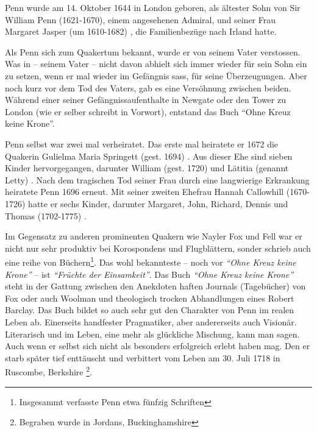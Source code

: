 \medskip

Penn wurde am 14. Oktober 1644 in London
 geboren, als ältester Sohn von Sir William Penn
(1621-1670), einem angesehenen Admiral, und
seiner Frau Margaret Jasper (um 1610-1682) ,
die Familienbezüge nach Irland  hatte.

\medskip

Als Penn sich zum Quakertum bekannt, wurde er von seinem Vater verstossen. Was
in -- seinem Vater -- nicht davon abhielt sich immer wieder für sein Sohn ein zu
setzen, wenn er mal wieder im Gefängnis sass, für seine Überzeugungen. Aber noch
kurz vor dem Tod des Vaters, gab es eine Versöhnung zwischen beiden. Während
einer seiner Gefängnissaufenthalte in Newgate  oder den Tower zu London (wie er selber schreibt in Vorwort), entstand
das Buch "`Ohne Kreuz keine Krone"'.

\medskip

Penn selbst war zwei mal verheiratet. Das erste mal heiratete er 1672 die
Quakerin Gulielma Maria Springett (gest. 1694)
. Aus dieser Ehe sind sieben Kinder
hervorgegangen, darunter William (gest. 1720) und Lätitia (genannt Letty)
. Nach dem tragischen Tod seiner Frau
durch eine langwierige Erkrankung heiratete Penn 1696 erneut. Mit seiner zweiten
Ehefrau Hannah Callowhill (1670-1726)  hatte
er sechs Kinder, darunter Margaret, John, Richard, Dennis und Thomas (1702-1775)
.

\medskip

Im Gegensatz zu anderen prominenten Quakern wie Nayler  Fox und Fell war er nicht nur sehr produktiv bei Korospondens und
Flugblättern, sonder schrieb auch eine reihe von
Büchern\footnote{Insgesammt verfasste Penn etwa fünfzig Schriften}.
Das wohl bekannteste -- noch vor \textit{"`Ohne Kreuz keine Krone"'} -- ist
\textit{"`Früchte der Einsamkeit"'}. Das Buch \textit{"`Ohne Kreuz keine
Krone"'} steht in der Gattung zwischen den Anekdoten haften Journals (Tagebücher) von Fox
oder auch Woolman und theologisch trocken
Abhandlungen eines Robert Barclay. Das Buch
bildet so auch sehr gut den Charakter von Penn im realen Leben ab. Einerseits
handfester Pragmatiker, aber andererseits auch Visionär. Literarisch und im Leben,
eine mehr als glückliche Mischung, kann man sagen. Auch wenn er selbst sich
nicht als besonders erfolgreich erlebt haben mag. Den er starb später tief
enttäuscht und verbittert vom Leben am 30. Juli 1718 in Ruscombe, Berkshire
\footnote{Begraben wurde in
Jordans, Buckinghamshire }.

